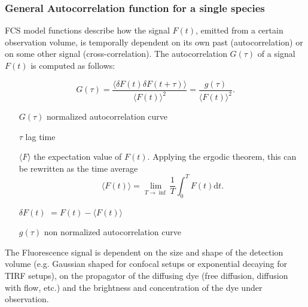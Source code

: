 	\subsubsection{General Autocorrelation function for a single species}
	FCS model functions describe how the signal $F(t)$, emitted from a certain observation volume, is temporally dependent on its own past (autocorrelation) or on some other signal (cross-correlation). The autocorrelation $G(\tau)$ of a signal $F(t)$ is computed as follows:
	\newline
	\newline
	\begin{minipage}{\textwidth}
	\begin{equation}
	G(\tau) = \frac{\langle \delta F(t) \delta F(t+\tau) \rangle}{\langle F(t) \rangle^2} = \frac{g(\tau)}{\langle F(t) \rangle^2}.
	\end{equation}
	\begin{itemize} \small
	\item[$G(\tau)$] normalized autocorrelation curve
	\item[$\tau$] lag time
	\item[$\langle F \rangle$] the expectation value of $F(t)$. Applying the ergodic theorem, this can be rewritten as the time average \[ \langle F(t) \rangle = \lim_{T \rightarrow \inf }\frac{1}{T} \int_0^T F(t) \mathrm{d}t. \]	
	\item[$\delta F(t)$] $= F(t) - \langle F(t) \rangle$
	\item[$g(\tau)$] non normalized autocorrelation curve
	\end{itemize}
	\end{minipage}
	\newline
	\newline
	\newline
	The Fluorescence signal is dependent on the size and shape of the detection volume (e.g. Gaussian shaped for confocal setups or exponential decaying for TIRF setups), on the propagator of the diffusing dye (free diffusion, diffusion with flow, etc.) and the brightness and concentration of the dye under observation.  \\
	\newline
